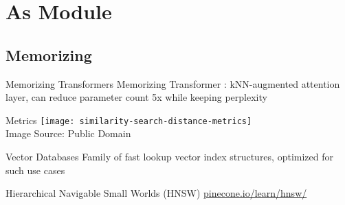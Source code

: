 \section{As Module}

\subsection{Memorizing}


\begin{frame}[c]{Memorizing Transformers}
    Memorizing Transformer \cite{wu_memorizing_2022}: kNN-augmented attention layer, can reduce parameter count 5x while keeping perplexity
\end{frame}


\begin{frame}[c]{Metrics}
    \texttt{[image: similarity-search-distance-metrics]} \\
    Image Source: Public Domain
\end{frame}

\begin{frame}[c]{Vector Databases}
    Family of fast lookup vector index structures, optimized for such use cases

    Hierarchical Navigable Small Worlds (HNSW)
    \url{pinecone.io/learn/hnsw/}
\end{frame}
